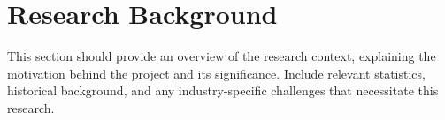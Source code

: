\section{Research Background}
\label{sec:background}
This section should provide an overview of the research context, explaining the motivation behind the project and its significance. Include relevant statistics, historical background, and any industry-specific challenges that necessitate this research.
